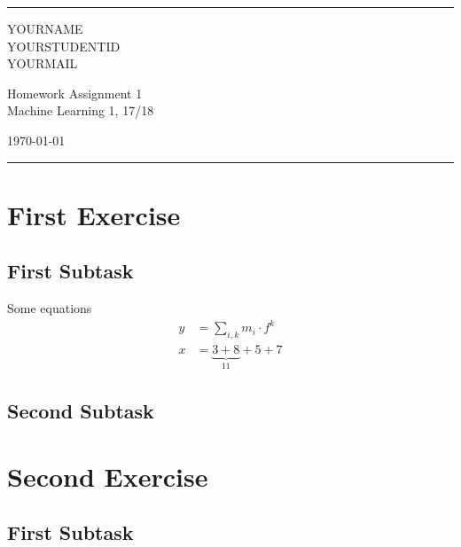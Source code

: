 \documentclass[a4paper]{article}
\begin{document}

\fancyhead[C]{}
\hrule \medskip %
\begin{minipage}{0.295\textwidth} 
\raggedright
\footnotesize
YOURNAME \hfill\\   
YOURSTUDENTID\hfill\\
YOURMAIL
\end{minipage}
\begin{minipage}{0.4\textwidth} 
\centering 
\large 
Homework Assignment 1\\ 
\normalsize 
Machine Learning 1, 17/18\\ 
\end{minipage}
\begin{minipage}{0.295\textwidth} 
\raggedleft
\today\hfill\\
\end{minipage}
\medskip\hrule 
\bigskip


\section{First Exercise}
\blindtext
\subsection{First Subtask}
Some equations
\begin{align*}
y &=  \sum\limits_{i,k} m_i \cdot f^k \\
x &=  
\underset{11}{\underbrace{3 + 8}} + 5 + 7
\end{align*}

\subsection{Second Subtask}
\blindtext

\bigskip


\section{Second Exercise}
\blindtext
\subsection{First Subtask}

\bigskip

\end{document}
